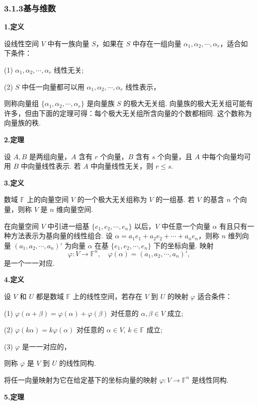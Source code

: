 \documentclass[UTF8, 12pt, fontset=fandol, oneside]{ctexart}
\begin{document}
\subsubsection*{3.1.3\quad 基与维数}

\noindent\textbf{1.\quad 定义}

设线性空间 $V$ 中有一族向量 $S$，如果在 $S$ 中存在一组向量 $\alpha_1,\alpha_2,\cdots,\alpha_r$，适合如下条件：

(1) $\alpha_1,\alpha_2,\cdots,\alpha_r$ 线性无关;

(2) $S$ 中任一向量都可以用 $\alpha_1,\alpha_2,\cdots,\alpha_r$ 线性表示，

则称向量组 $\{\alpha_1,\alpha_2,\cdots,\alpha_r\}$ 是向量族 $S$ 的极大无关组. 向量族的极大无关组可能有许多，但由下面的定理可得：每个极大无关组所含向量的个数都相同. 这个数称为向量族的秩.

\noindent\textbf{2.\quad 定理}

设 $A,B$ 是两组向量，$A$ 含有 $r$ 个向量，$B$ 含有 $s$ 个向量，且 $A$ 中每个向量均可用 $B$ 中向量线性表示. 若 $A$ 中向量线性无关，则 $r\le s$.

\noindent\textbf{3.\quad 定义}

数域 $\mathbb{F}$ 上的向量空间 $V$ 的一个极大无关组称为 $V$ 的一组基. 若 $V$ 的基含 $n$ 个向量，则称 $V$ 是 $n$ 维向量空间.

在向量空间 $V$ 中引进一组基 $\{e_1,e_2,\cdots,e_n\}$ 以后，$V$ 中任意一个向量 $\alpha$ 有且只有一种方法表示为基向量的线性组合. 设 $\alpha=a_1e_1+a_2e_2+\cdots+a_ne_n$，则称 $n$ 维列向量 $(a_1,a_2,\cdots,a_n)'$ 为向量 $\alpha$ 在基 $\{e_1,e_2,\cdots,e_n\}$ 下的坐标向量. 映射
\[
\varphi:V\to\mathbb{F}^n,\quad \varphi(\alpha)=(a_1,a_2,\cdots,a_n)',
\]
是一个一一对应.

\noindent\textbf{4.\quad 定义}

设 $V$ 和 $U$ 都是数域 $\mathbb{F}$ 上的线性空间，若存在 $V$ 到 $U$ 的映射 $\varphi$ 适合条件：

(1) $\varphi(\alpha+\beta)=\varphi(\alpha)+\varphi(\beta)$ 对任意的 $\alpha,\beta\in V$ 成立;

(2) $\varphi(k\alpha)=k\varphi(\alpha)$ 对任意的 $\alpha\in V$, $k\in\mathbb{F}$ 成立;

(3) $\varphi$ 是一一对应的，

则称 $\varphi$ 是 $V$ 到 $U$ 的线性同构.

将任一向量映射为它在给定基下的坐标向量的映射 $\varphi:V\to\mathbb{F}^n$ 是线性同构.

\noindent\textbf{5.\quad 定理}
\end{document}

